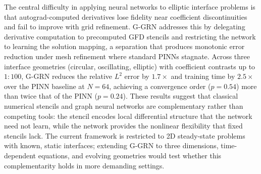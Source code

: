 \documentclass[11pt]{article}
\theoremstyle{definition}
\theoremstyle{remark}
\theoremstyle{plain}
\begin{document}
The central difficulty in applying neural networks to elliptic interface problems is that autograd-computed derivatives lose fidelity near coefficient discontinuities and fail to improve with grid refinement. G-GRN addresses this by delegating derivative computation to precomputed GFD stencils and restricting the network to learning the solution mapping, a separation that produces monotonic error reduction under mesh refinement where standard PINNs stagnate. Across three interface geometries (circular, oscillating, elliptic) with coefficient contrasts up to $1{:}100$, G-GRN reduces the relative $L^2$ error by $1.7\times$ and training time by $2.5\times$ over the PINN baseline at $N=64$, achieving a convergence order ($p=0.54$) more than twice that of the PINN ($p=0.24$). These results suggest that classical numerical stencils and graph neural networks are complementary rather than competing tools: the stencil encodes local differential structure that the network need not learn, while the network provides the nonlinear flexibility that fixed stencils lack. The current framework is restricted to 2D steady-state problems with known, static interfaces; extending G-GRN to three dimensions, time-dependent equations, and evolving geometries would test whether this complementarity holds in more demanding settings.


\end{document}
